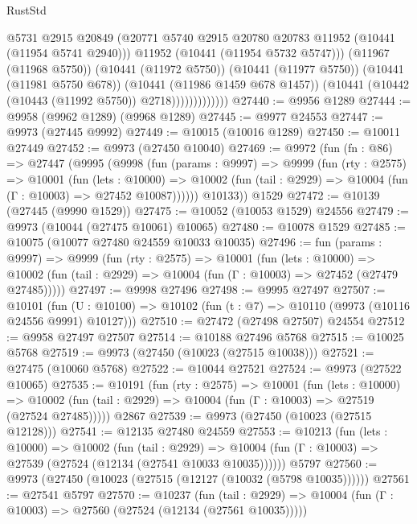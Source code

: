 \begin{lexlean}{RustStd}
\begin{coremodule}
                            @5731
                            @2915
                            @20849
                            (@20771 @5740 @2915 @20780 @20783 @11952 (@10441 (@11954 @5741 @2940)))
                            @11952
                            (@10441 (@11954 @5732 @5747)))
                          (@11967 (@11968 @5750))
                          (@10441 (@11972 @5750))
                          (@10441 (@11977 @5750))
                          (@10441 (@11981 @5750 @678))
                          (@10441 (@11986 @1459 @678 @1457))
                          (@10441 (@10442 (@10443 (@11992 @5750)) @2718)))))))))))))
@27440 := @9956 @1289
@27444 := @9958 (@9962 @1289) (@9968 @1289)
@27445 := @9977 @24553
@27447 := @9973 (@27445 @9992)
@27449 := @10015 (@10016 @1289)
@27450 := @10011 @27449
@27452 := @9973 (@27450 @10040)
@27469 := @9972
    (fun (fn : @86) =>
    @27447
      (@9995
        (@9998
          (fun (params : @9997) =>
          @9999
            (fun (rty : @2575) =>
            @10001
              (fun (lets : @10000) =>
              @10002 (fun (tail : @2929) => @10004 (fun (Γ : @10003) => @27452 @10087))))))
        @10133))
    @1529
@27472 := @10139 (@27445 (@9990 @1529))
@27475 := @10052 (@10053 @1529) @24556
@27479 := @9973 (@10044 (@27475 @10061) @10065)
@27480 := @10078 @1529
@27485 := @10075 (@10077 @27480 @24559 @10033 @10035)
@27496 := fun (params : @9997) =>
  @9999
    (fun (rty : @2575) =>
    @10001
      (fun (lets : @10000) =>
      @10002 (fun (tail : @2929) => @10004 (fun (Γ : @10003) => @27452 (@27479 @27485)))))
@27497 := @9998 @27496
@27498 := @9995 @27497
@27507 := @10101
    (fun (U : @10100) => @10102 (fun (t : @7) => @10110 (@9973 (@10116 @24556 @9991) @10127)))
@27510 := @27472 (@27498 @27507) @24554
@27512 := @9958 @27497 @27507
@27514 := @10188 @27496 @5768
@27515 := @10025 @5768
@27519 := @9973 (@27450 (@10023 (@27515 @10038)))
@27521 := @27475 (@10060 @5768)
@27522 := @10044 @27521
@27524 := @9973 (@27522 @10065)
@27535 := @10191
    (fun (rty : @2575) =>
    @10001
      (fun (lets : @10000) =>
      @10002 (fun (tail : @2929) => @10004 (fun (Γ : @10003) => @27519 (@27524 @27485)))))
    @2867
@27539 := @9973 (@27450 (@10023 (@27515 @12128)))
@27541 := @12135 @27480 @24559
@27553 := @10213
    (fun (lets : @10000) =>
    @10002
      (fun (tail : @2929) =>
      @10004 (fun (Γ : @10003) => @27539 (@27524 (@12134 (@27541 @10033 @10035))))))
    @5797
@27560 := @9973 (@27450 (@10023 (@27515 (@12127 (@10032 (@5798 @10035))))))
@27561 := @27541 @5797
@27570 := @10237
    (fun (tail : @2929) => @10004 (fun (Γ : @10003) => @27560 (@27524 (@12134 (@27561 @10035)))))

\end{coremodule}
\end{lexlean}
